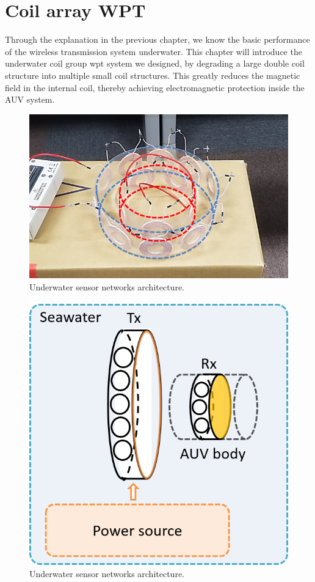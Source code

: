 \chapter{Coil array WPT}
Through the explanation in the previous chapter, we know the basic performance of the wireless transmission system underwater. This chapter will introduce the underwater coil group wpt system we designed, by degrading a large double coil structure into multiple small coil structures. This greatly reduces the magnetic field in the internal coil, thereby achieving electromagnetic protection inside the AUV system.

\begin{figure}[htbp]
    \centering
    \includegraphics[width=0.7\linewidth]{images/3_coil_array_structure.png}
    \caption{Underwater sensor networks architecture.}
    \label{fig:3_coil_array_structure}
\end{figure}

\begin{figure}[htbp]
    \centering
    \includegraphics[width=0.5\linewidth]{images/3_coil_array_uwpt.png}
    \caption{Underwater sensor networks architecture.}
    \label{fig:3_coil_array_uwpt}
\end{figure}

